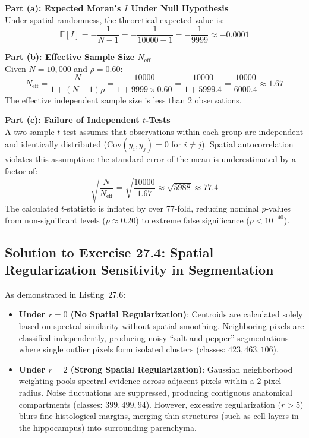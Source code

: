 \documentclass[11pt,twoside,openright]{book}
\begin{document}
\noindent
\textbf{Part (a): Expected Moran's $I$ Under Null Hypothesis}\\
Under spatial randomness, the theoretical expected value is:
\begin{equation}
\mathbb{E}[I] = -\frac{1}{N - 1} = -\frac{1}{10000 - 1} = -\frac{1}{9999} \approx -0.0001
\end{equation}

\noindent
\textbf{Part (b): Effective Sample Size $N_{\text{eff}}$}\\
Given $N = 10{,}000$ and $\rho = 0.60$:
\begin{equation}
N_{\text{eff}} = \frac{N}{1 + (N - 1) \rho} = \frac{10000}{1 + 9999 \times 0.60} = \frac{10000}{1 + 5999.4} = \frac{10000}{6000.4} \approx 1.67
\end{equation}
The effective independent sample size is less than $2$ observations.

\noindent
\textbf{Part (c): Failure of Independent $t$-Tests}\\
A two-sample $t$-test assumes that observations within each group are independent and identically distributed ($\text{Cov}(y_i, y_j) = 0$ for $i \ne j$). Spatial autocorrelation violates this assumption: the standard error of the mean is underestimated by a factor of:
\begin{equation}
\sqrt{\frac{N}{N_{\text{eff}}}} = \sqrt{\frac{10000}{1.67}} \approx \sqrt{5988} \approx 77.4
\end{equation}
The calculated $t$-statistic is inflated by over $77$-fold, reducing nominal $p$-values from non-significant levels ($p \approx 0.20$) to extreme false significance ($p < 10^{-40}$).

\subsection{Solution to Exercise 27.4: Spatial Regularization Sensitivity in Segmentation}

As demonstrated in Listing~27.6:
\begin{itemize}
    \item \textbf{Under $r = 0$ (No Spatial Regularization)}: Centroids are calculated solely based on spectral similarity without spatial smoothing. Neighboring pixels are classified independently, producing noisy ``salt-and-pepper'' segmentations where single outlier pixels form isolated clusters (classes: $423, 463, 106$).
    \item \textbf{Under $r = 2$ (Strong Spatial Regularization)}: Gaussian neighborhood weighting pools spectral evidence across adjacent pixels within a $2$-pixel radius. Noise fluctuations are suppressed, producing contiguous anatomical compartments (classes: $399, 499, 94$). However, excessive regularization ($r > 5$) blurs fine histological margins, merging thin structures (such as cell layers in the hippocampus) into surrounding parenchyma.
\end{itemize}
\end{document}

